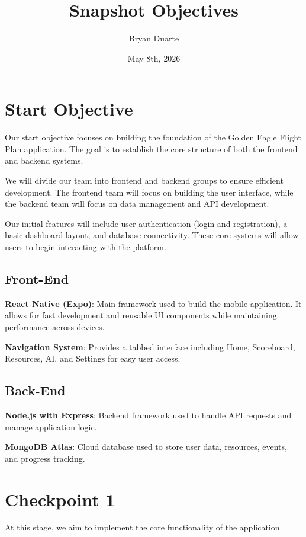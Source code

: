 \documentclass{article}
\begin{document}
\title{Snapshot Objectives}
\author{Bryan Duarte}
\date{May 8th, 2026}

\maketitle

\section{Start Objective}
\fancyhf{}
\fancyfoot[C]{\thepage}

Our start objective focuses on building the foundation of the Golden Eagle Flight Plan application. The goal is to establish the core structure of both the frontend and backend systems.

We will divide our team into frontend and backend groups to ensure efficient development. The frontend team will focus on building the user interface, while the backend team will focus on data management and API development.

Our initial features will include user authentication (login and registration), a basic dashboard layout, and database connectivity. These core systems will allow users to begin interacting with the platform.

\subsection{Front-End}
\textbf{React Native (Expo)}: Main framework used to build the mobile application. It allows for fast development and reusable UI components while maintaining performance across devices.

\textbf{Navigation System}: Provides a tabbed interface including Home, Scoreboard, Resources, AI, and Settings for easy user access.

\subsection{Back-End}

\textbf{Node.js with Express}: Backend framework used to handle API requests and manage application logic.

\textbf{MongoDB Atlas}: Cloud database used to store user data, resources, events, and progress tracking.

\section{Checkpoint 1}
At this stage, we aim to implement the core functionality of the application.
\end{document}

